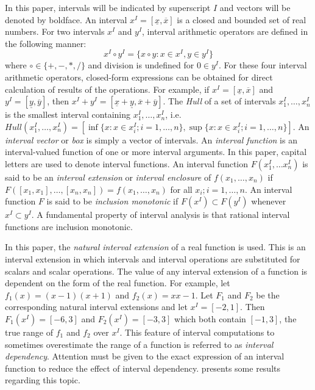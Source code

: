 In this paper, intervals will be indicated by superscript $I$ and vectors will
be denoted by boldface.
An interval $x^I = [\underline{x}, \overline{x}]$ 
is a closed and bounded set of
real numbers.  For two intervals $x^I$ and $y^I$, 
interval arithmetic operators are defined in the following manner:
$$
x^I \circ y^I =  \{x\circ y : x \in x^I, y \in y^I \}
$$
where $\circ \in \{+,-,*,/ \}$ and division is undefined for $0 \in y^I$.
For these four interval arithmetic operators, closed-form expressions can be
obtained for direct calculation of results of the operations.
For example, if $x^I = [\underline{x},\overline{x}]$ and 
$y^I = [\underline{y},\overline{y}]$, then
$ x^I + y^I = [\underline{x}+\underline{y}, \overline{x}+\overline{y}]$.
The {\it Hull} of a set of intervals $x_1^I,\ldots,x_n^I$ is the smallest
interval containing $x_1^I,\ldots,x_n^I$, i.e.
$Hull(x_1^I,\ldots,x_n^I) = [\inf\{x : x\in x_i^I; i=1,\ldots,n\}, 
\sup\{x : x\in x_i^I; i=1,\ldots,n\}]$.
An {\it interval vector} or {\it box} is simply a vector of intervals.
An {\it interval function} is an interval-valued function of one or more
interval arguments.
In this paper, capital letters are used to denote interval functions.
An interval function $F(x^I_1, \ldots x_n^I)$ 
is said to be an
{\it interval extension} or {\it interval enclosure} 
of $f(x_1, \ldots, x_n)$ if 
$F([x_1,x_1], \ldots, [x_n,x_n]) = f(x_1, \ldots, x_n)$
for all $x_i; i=1,\ldots,n$.
An interval function $F$ is said to be {\it inclusion monotonic} if 
$F(x^I) \subset F(y^I)$ 
whenever $x^I \subset y^I$.
A fundamental property of interval analysis is that rational interval
functions are inclusion monotonic.

In this paper, the {\it natural interval extension} of a real function 
is used.  This is an interval extension
in which intervals and interval operations 
are substituted for scalars and scalar operations.
The value of any interval extension of 
a function
is dependent on the form of the real function.  For example,
let $f_1 (x) = (x-1)(x+1)$ and $f_2 (x) = xx-1$.
Let $F_1$ and $F_2$ be the corresponding natural interval
extensions and let $x^I = [-2,1]$.  Then
$F_1(x^I) = [-6, 3]$ and $F_2(x^I) = [-3, 3]$
which both contain $[-1, 3]$, the true range of $f_1$ and $f_2$ over $x^I$.
This feature of interval computations to sometimes
overestimate the range of a function
is referred to as {\it interval dependency}.  Attention must be given to the
exact expression of an interval
function to reduce the effect of interval dependency.
\cite{HansenBook,Hansen:Sharp} presents some results regarding this topic.

